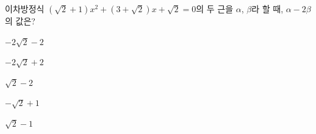 이차방정식 $(\sqrt{2}+1)x^2+(3+\sqrt{2})x+\sqrt{2}=0$의 두 근을 $\alpha$, $\beta$라 할 때, $\alpha-2\beta$의 값은? \cond{$\alpha<\beta$}
\begin{choices32}{\rule[-3ex]{0pt}{8ex}$-2\sqrt{2}-2$}{\rule[-3ex]{0pt}{8ex}$-2\sqrt{2}+2$}{\rule[-3ex]{0pt}{8ex}$\sqrt{2}-2$}{\rule[-3ex]{0pt}{8ex}$-\sqrt{2}+1$}{\rule[-3ex]{0pt}{8ex}$\sqrt{2}-1$}\end{choices32}
